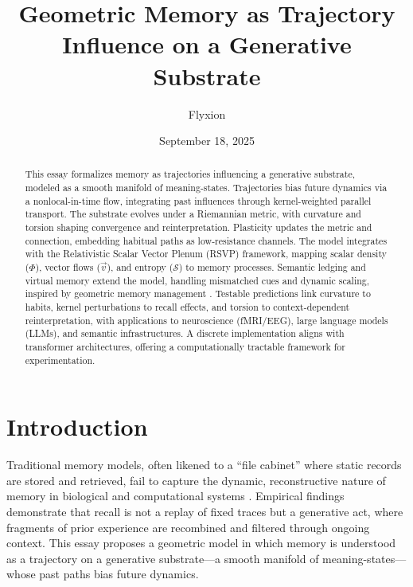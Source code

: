 \documentclass[a4paper,12pt]{article}
\newcommand{\Scal}{\mathcal{S}}
\newcommand{\vvec}{\vec{v}}
\begin{document}
\title{Geometric Memory as Trajectory Influence on a Generative Substrate}
\author{Flyxion}
\date{September 18, 2025}
\maketitle

\begin{abstract}
This essay formalizes memory as trajectories influencing a generative substrate, modeled as a smooth manifold of meaning-states. Trajectories bias future dynamics via a nonlocal-in-time flow, integrating past influences through kernel-weighted parallel transport. The substrate evolves under a Riemannian metric, with curvature and torsion shaping convergence and reinterpretation. Plasticity updates the metric and connection, embedding habitual paths as low-resistance channels. The model integrates with the Relativistic Scalar Vector Plenum (RSVP) framework, mapping scalar density ($\Phi$), vector flows ($\vvec$), and entropy ($\Scal$) to memory processes. Semantic ledging and virtual memory extend the model, handling mismatched cues and dynamic scaling, inspired by geometric memory management \citep{kuijper2021geometric}. Testable predictions link curvature to habits, kernel perturbations to recall effects, and torsion to context-dependent reinterpretation, with applications to neuroscience (fMRI/EEG), large language models (LLMs), and semantic infrastructures. A discrete implementation aligns with transformer architectures, offering a computationally tractable framework for experimentation.
\end{abstract}

\tableofcontents

\section{Introduction}
Traditional memory models, often likened to a ``file cabinet'' where static records are 
stored and retrieved, fail to capture the dynamic, reconstructive nature of memory in 
biological and computational systems \citep{mcclelland1995why}. Empirical findings 
demonstrate that recall is not a replay of fixed traces but a generative act, where 
fragments of prior experience are recombined and filtered through ongoing context. 
This essay proposes a geometric model in which memory is understood as a trajectory 
on a generative substrate---a smooth manifold of meaning-states---whose past paths 
bias future dynamics. 
\end{document}
